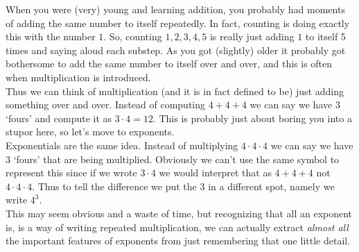 \documentclass{ximeraXloud}
\begin{document}
        When you were (very) young and learning addition, you probably had moments of adding the same number to itself repeatedly. In fact, counting is doing exactly this with the number $1$. So, counting $1,2,3,4,5$ is really just adding $1$ to itself 5 times and saying aloud each substep. As you got (slightly) older it probably got bothersome to add the same number to itself over and over, and this is often when multiplication is introduced.\\
        Thus we can think of multiplication (and it is in fact defined to be) just adding something over and over. Instead of computing $4 + 4 + 4$ we can say we have $3$ `fours' and compute it as $3 \cdot 4 = 12$. This is probably just about boring you into a stupor here, so let's move to exponents.\\
        Exponentials are the same idea. Instead of multiplying $4 \cdot 4 \cdot 4$ we can say we have $3$ `fours' that are being multiplied. Obviously we can't use the same symbol to represent this since if we wrote $3 \cdot 4$ we would interpret that as $4 + 4 + 4$ not $4 \cdot 4 \cdot 4$. Thus to tell the difference we put the $3$ in a different spot, namely we write $4^3$.\\
        This may seem obvious and a waste of time, but recognizing that all an exponent is, is a way of writing repeated multiplication, we can actually extract \textit{almost all} the important features of exponents from just remembering that one little detail.

\end{document}
